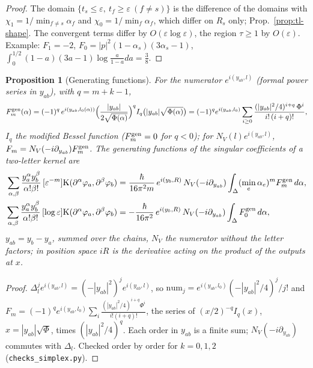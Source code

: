 \documentclass[11pt]{article}
\numberwithin{equation}{section}
\theoremstyle{plain}
\newtheorem{proposition}[theorem]{Proposition}
\theoremstyle{definition}
\begin{document}
\begin{proof}
The domain $\{t_s\le\varepsilon,\ t_f\ge\varepsilon\ (f\ne s)\}$ is the difference of the domains with $\chi_1=1/\min_{f\ne s}\alpha_f$ and $\chi_0=1/\min_f\alpha_f$, which differ on $R_s$ only; Prop.~\ref{prop:tl-shape}. The convergent terms differ by $O(\varepsilon\log\varepsilon)$, the region $\tau\ge1$ by $O(\varepsilon)$. Example: $F_1=-2$, $F_0=|p|^2(1-\alpha_s)(3\alpha_s-1)$, $\int_0^{1/2}(1-a)(3a-1)\log\frac a{1-a}da=\frac38$.
\end{proof}

\begin{proposition}[Generating functions]
\label{prop:tl-genfun}
For the numerator $e^{i(y_{ab},l)}$ (formal power series in $y_{ab}$), with $q=m+k-1$,
\begin{equation}
F_m^{\rm gen}(\alpha)=(-1)^{q}\,e^{i(y_{ab},l_0(\alpha))}\Big(\frac{|y_{ab}|}{2\sqrt{\Phi(\alpha)}}\Big)^{q}I_{q}\big(|y_{ab}|\sqrt{\Phi(\alpha)}\big)=(-1)^{q}e^{i(y_{ab},l_0)}\sum_{i\ge0}\frac{(|y_{ab}|^2/4)^{i+q}\,\Phi^i}{i!\,(i+q)!},
\label{eq:tl-genfun}
\end{equation}
$I_q$ the modified Bessel function ($F^{\rm gen}_m=0$ for $q<0$); for $N_V(l)e^{i(y_{ab},l)}$, $F_m=N_V(-i\partial_{y_{ab}})F_m^{\rm gen}$. The generating functions of the singular coefficients of a two-letter kernel are
\[
\begin{aligned}
\sum_{\alpha,\beta}\frac{y_a^\alpha y_b^\beta}{\alpha!\beta!}\,[\varepsilon^{-m}]\mathrm K(\partial^\alpha\varphi_a,\partial^\beta\varphi_b)&=\frac{\hbar}{16\pi^2m}\,e^{i(y_b,R)}\,N_V(-i\partial_{y_{ab}})\int_\Delta(\min_e\alpha_e)^mF_m^{\rm gen}\,d\alpha,\\
\sum_{\alpha,\beta}\frac{y_a^\alpha y_b^\beta}{\alpha!\beta!}\,[\log\varepsilon]\mathrm K(\partial^\alpha\varphi_a,\partial^\beta\varphi_b)&=-\frac{\hbar}{16\pi^2}\,e^{i(y_b,R)}\,N_V(-i\partial_{y_{ab}})\int_\Delta F_0^{\rm gen}\,d\alpha,
\end{aligned}
\]
$y_{ab}=y_b-y_a$, summed over the chains, $N_V$ the numerator without the letter factors; in position space $iR$ is the derivative acting on the product of the outputs at $x$.
\end{proposition}

\begin{proof}
$\Delta_l^je^{i(y_{ab},l)}=(-|y_{ab}|^2)^je^{i(y_{ab},l)}$, so $\mathrm{num}_j=e^{i(y_{ab},l_0)}(-|y_{ab}|^2/4)^j/j!$ and $F_m=(-1)^qe^{i(y_{ab},l_0)}\sum_i\frac{(|y_{ab}|^2/4)^{i+q}\Phi^i}{i!(i+q)!}$, the series of $(x/2)^{-q}I_q(x)$, $x=|y_{ab}|\sqrt\Phi$, times $(|y_{ab}|^2/4)^q$. Each order in $y_{ab}$ is a finite sum; $N_V(-i\partial_{y_{ab}})$ commutes with $\Delta_l$. Checked order by order for $k=0,1,2$ (\texttt{checks\_simplex.py}).
\end{proof}
\end{document}
